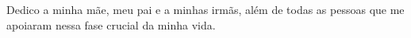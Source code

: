 
\begin{dedicatoria}
\begin{flushright}
\hspace{.45\textwidth}
\begin{minipage}{.55\textwidth}

Dedico a minha mãe, meu pai e a minhas irmãs,
além de todas as pessoas que me apoiaram nessa fase crucial da minha vida.

    \end{minipage}%
 \end{flushright}
\end{dedicatoria}


